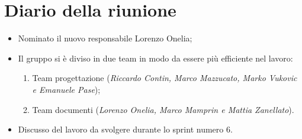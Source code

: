 \section{Diario della riunione}
\begin{itemize}
  \item Nominato il nuovo responsabile Lorenzo Onelia;
  \item Il gruppo si è diviso in due team in modo da essere più efficiente nel lavoro:
    \begin{enumerate}
      \item Team progettazione (\textit{Riccardo Contin, Marco Mazzucato, Marko Vukovic e Emanuele Pase});
      \item Team documenti (\textit{Lorenzo Onelia, Marco Mamprin e Mattia Zanellato}).
    \end{enumerate}
  \item Discusso del lavoro da svolgere durante lo sprint numero 6.
\end{itemize}
